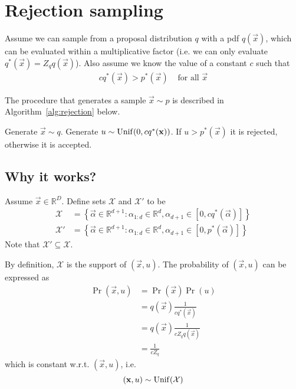 \section{Rejection sampling}

Assume we can sample from a proposal distribution $q$ with a pdf $q(\vec x)$, which can be evaluated within a multiplicative factor (i.e. we can only evaluate $q^\ast(\vec x) = Z_q q(\vec x)$). Also assume we know the value of a constant $c$ such that
\begin{align}
    c q^\ast(\vec x) > p^\ast(\vec x) & \text{ for all } \vec x
\end{align}

The procedure that generates a sample $\vec x \sim p$ is described in Algorithm~\ref{alg:rejection} below.
\begin{algorithmbis}\label{alg:rejection}
    \begin{algorithmic}[1]
        \State Generate $\vec x \sim q$.
        \State Generate $u \sim \operatorname{Unif}(0, c q^\ast(\boldsymbol{\mathbf{x}}))$.
        \State If $u > p^\ast(\vec x)$ it is rejected, otherwise it is accepted.
    \end{algorithmic}
\end{algorithmbis}


\subsection{Why it works?}
    Assume $\vec x \in \mathbb R^D$. Define sets $\mathcal X$ and $\mathcal X'$ to be
    \begin{align}
        \mathcal X &= \left\{\vec \alpha \in \mathbb R^{d + 1}: \alpha_{1:d} \in \mathbb R^d, \alpha_{d + 1} \in [0, c q^\ast(\vec \alpha)]\right\} \\
        \mathcal X' &= \left\{\vec \alpha \in \mathbb R^{d + 1}: \alpha_{1:d} \in \mathbb R^d, \alpha_{d + 1} \in [0, p^\ast(\vec \alpha)]\right\}
    \end{align}
    Note that $\mathcal X' \subseteq \mathcal X$.

    By definition, $\mathcal X$ is the support of $(\vec x, u)$. The probability of $(\vec x, u)$ can be expressed as
    \begin{align}
        \Pr(\vec x, u)  &= \Pr(\vec x) \Pr(u) \\
                        &= q(\vec x) \frac{1}{c q^\ast(\vec x)} \\
                        &= q(\vec x) \frac{1}{c Z_q q(\vec x)} \\
                        &= \frac{1}{c Z_q}
    \end{align}
    which is constant w.r.t. $(\vec x, u)$, i.e.
    \begin{equation}
        (\boldsymbol{\mathbf{x}}, u) \sim \operatorname{Unif}(\mathcal X)
    \end{equation}

